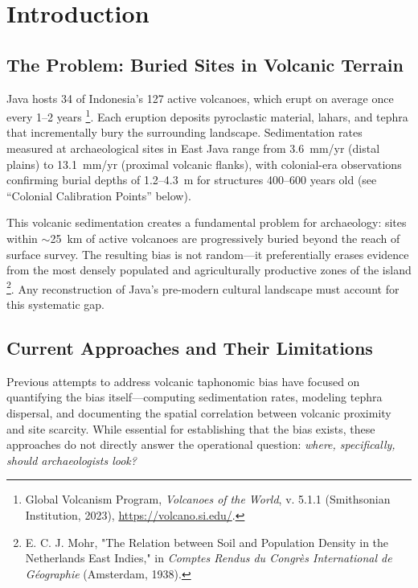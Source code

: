 \documentclass[12pt,a4paper]{article}
\begin{document}
\section{Introduction}

\subsection{The Problem: Buried Sites in Volcanic Terrain}

Java hosts 34 of Indonesia's 127 active volcanoes, which erupt on average once every 1--2 years \footnote{Global Volcanism Program, \emph{Volcanoes of the World}, v. 5.1.1 (Smithsonian Institution, 2023), \url{https://volcano.si.edu/}.}. Each eruption deposits pyroclastic material, lahars, and tephra that incrementally bury the surrounding landscape. Sedimentation rates measured at archaeological sites in East Java range from 3.6~mm/yr (distal plains) to 13.1~mm/yr (proximal volcanic flanks), with colonial-era observations confirming burial depths of 1.2--4.3~m for structures 400--600 years old (see ``Colonial Calibration Points'' below).

This volcanic sedimentation creates a fundamental problem for archaeology: sites within $\sim$25~km of active volcanoes are progressively buried beyond the reach of surface survey. The resulting bias is not random---it preferentially erases evidence from the most densely populated and agriculturally productive zones of the island \footnote{E. C. J. Mohr, "The Relation between Soil and Population Density in the Netherlands East Indies," in \emph{Comptes Rendus du Congr\`{e}s International de G\'eographie} (Amsterdam, 1938).}. Any reconstruction of Java's pre-modern cultural landscape must account for this systematic gap.

\subsection{Current Approaches and Their Limitations}

Previous attempts to address volcanic taphonomic bias have focused on quantifying the bias itself---computing sedimentation rates, modeling tephra dispersal, and documenting the spatial correlation between volcanic proximity and site scarcity. While essential for establishing that the bias exists, these approaches do not directly answer the operational question: \emph{where, specifically, should archaeologists look?}
\end{document}
